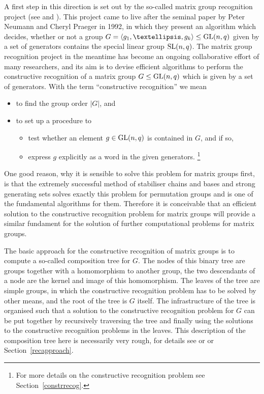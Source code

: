 A first step in this direction is set out by the so-called matrix group
recognition project (see \cite{MatGrpProj} and \cite{OB}). This project
came to live after the seminal paper \cite{neumann-praeger} by Peter Neumann 
and Cheryl Praeger in 1992, in which they present an algorithm which decides,
whether or not a group $G = \left< g_1, \ldots, g_k\right> \le \GL(n,q)$
given by a set of generators contains the special linear group $\SL(n,q)$.
The matrix group recognition project in the meantime has become an ongoing 
collaborative effort of many researchers, and its aim
is to devise efficient algorithms to perform the constructive recognition
of a matrix group $G \le \GL(n,q)$ which is given by a set of generators. 
With the term ``constructive recognition'' we mean
\begin{itemize}
\setlength{\itemsep}{0pt}\setlength{\parskip}{0pt}
\item to find the group order $|G|$, and
\item to set up a procedure to 
\begin{itemize}
\setlength{\itemsep}{0pt}\setlength{\parskip}{0pt}
\item test whether an element $g \in \GL(n,q)$ is contained in $G$, and if so,
\item express $g$ explicitly as a word in the given generators.%
\footnote{For more details on the constructive recognition problem see
Section~\ref{constrrecog}.}
\end{itemize}
\end{itemize}
One good reason, why it is sensible to solve this problem for matrix groups
first, is that the extremely successful method of stabiliser chains and
bases and strong generating sets solves exactly
this problem for permutation groups and is one of the fundamental
algorithms for them. Therefore it is conceivable that an efficient solution
to the constructive recognition problem for matrix groups will provide a
similar fundament for the solution of further computational problems for
matrix groups.

The basic approach for the constructive recognition of matrix groups is
to compute a so-called composition tree for $G$. The nodes of this binary 
%
tree are groups together with a homomorphism to another group, the two
descendants of a node are the kernel and image of this homomorphism. The
leaves of the tree are simple groups, in which the constructive recognition
%
problem has to be solved by other means, and the root of the tree is $G$
itself. The infrastructure of the tree is organised such that a solution to
the constructive recognition problem for $G$ can be put together
by recursively traversing the tree and finally using the solutions to the
constructive recognition problems in the leaves. This description of the
composition tree here is
necessarily very rough, for details see \cite{MatGrpProj} or \cite{OB}
or Section~\ref{recapproach}.

